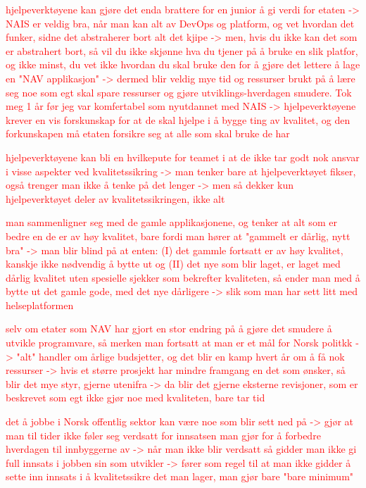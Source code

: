 \textcolor{red}{hjelpeverktøyene kan gjøre det enda brattere for en junior å gi verdi for etaten -> NAIS er veldig bra, når man kan alt av DevOps og platform, og vet hvordan det funker, sidne det abstraherer bort alt det kjipe -> men, hvis du ikke kan det som er abstrahert bort, så vil du ikke skjønne hva du tjener på å bruke en slik platfor, og ikke minst, du vet ikke hvordan du skal bruke den for å gjøre det lettere å lage en "NAV applikasjon" -> dermed blir veldig mye tid og ressurser brukt på å lære seg noe som egt skal spare ressurser og gjøre utviklings-hverdagen smudere. Tok meg 1 år før jeg var komfertabel som nyutdannet med NAIS -> hjelpeverktøyene krever en vis forskunskap for at de skal hjelpe i å bygge ting av kvalitet, og den forkunskapen må etaten forsikre seg at alle som skal bruke de har}

\textcolor{red}{hjelpeverktøyene kan bli en hvilkepute for teamet i at de ikke tar godt nok ansvar i visse aspekter ved kvalitetssikring -> man tenker bare at hjelpeverktøyet fikser, også trenger man ikke å tenke på det lenger -> men så dekker kun hjelpeverktøyet deler av kvalitetssikringen, ikke alt}

\textcolor{red}{man sammenligner seg med de gamle applikasjonene, og tenker at alt som er bedre en de er av høy kvalitet, bare fordi man hører at "gammelt er dårlig, nytt bra" -> man blir blind på at enten: (I) det gammle fortsatt er av høy kvalitet, kanskje ikke nødvendig å bytte ut og (II) det nye som blir laget, er laget med dårlig kvalitet uten spesielle sjekker som bekrefter kvaliteten, så ender man med å bytte ut det gamle gode, med det nye dårligere -> slik som man har sett litt med helseplatformen}

\textcolor{red}{selv om etater som NAV har gjort en stor endring på å gjøre det smudere å utvikle programvare, så merken man fortsatt at man er et mål for Norsk politkk -> "alt" handler om årlige budsjetter, og det blir en kamp hvert år om å få nok ressurser -> hvis et større prosjekt har mindre framgang en det som ønsker, så blir det mye styr, gjerne utenifra -> da blir det gjerne eksterne revisjoner, som er beskrevet som egt ikke gjør noe med kvaliteten, bare tar tid}

\textcolor{red}{det å jobbe i Norsk offentlig sektor kan være noe som blir sett ned på -> gjør at man til tider ikke føler seg verdsatt for innsatsen man gjør for å forbedre hverdagen til innbyggerne av -> når man ikke blir verdsatt så gidder man ikke gi full innsats i jobben sin som utvikler -> fører som regel til at man ikke gidder å sette inn innsats i å kvalitetssikre det man lager, man gjør bare "bare minimum"}

